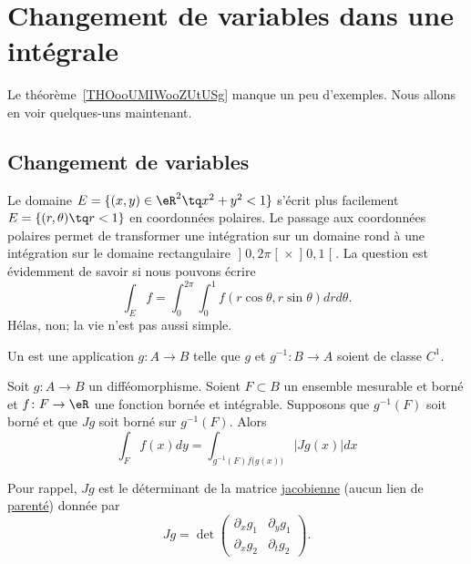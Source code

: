 \section{Changement de variables dans une intégrale}
\label{SECooOOPPooZLbaEH}

Le théorème~\ref{THOooUMIWooZUtUSg} manque un peu d'exemples. Nous allons en voir quelques-uns maintenant.

					\subsection{Changement de variables}

Le domaine $E=\{ (x,y)\in\eR^2\tq x^2+y^2<1 \}$ s'écrit plus facilement $E=\{ (r,\theta)\tq r<1 \}$ en coordonnées polaires. Le passage aux coordonnées polaires permet de transformer une intégration sur un domaine rond à une intégration sur le domaine rectangulaire $\mathopen]0,2\pi\mathclose[\times\mathopen]0,1\mathclose[$. La question est évidemment de savoir si nous pouvons écrire
\begin{equation}
	\int_Ef=\int_{0}^{2\pi}\int_0^1f(r\cos\theta,r\sin\theta)drd\theta.
\end{equation}
Hélas, non; la vie n'est pas aussi simple.

\begin{definition}
    Un  est une application $g\colon A\to B$ telle que $g$ et $g^{-1}\colon B\to A$ soient de classe $C^1$.
\end{definition}

\begin{theorem}
Soit $g\colon A\to B$ un difféomorphisme. Soient $F\subset B$ un ensemble mesurable et borné et $f\colon F\to \eR$ une fonction bornée et intégrable. Supposons que $g^{-1}(F)$ soit borné et que $Jg$ soit borné sur $g^{-1}(F)$. Alors
\begin{equation}
	\int_Ff(x)dy=\int_{g^{-1}(F)f\big( g(x) \big)}| Jg(x) |dx
\end{equation}
\end{theorem}
Pour rappel, $Jg$ est le déterminant de la matrice \href{http://fr.wikipedia.org/wiki/Matrice_jacobienne}{jacobienne} (aucun lien de \href{http://fr.wikipedia.org/wiki/Jacob}{parenté}) donnée par
\begin{equation}
	Jg=\det\begin{pmatrix}
	\partial_xg_1	&	\partial_yg_1	\\
	\partial_xg_2	&	\partial_tg_2
\end{pmatrix}.
\end{equation}


